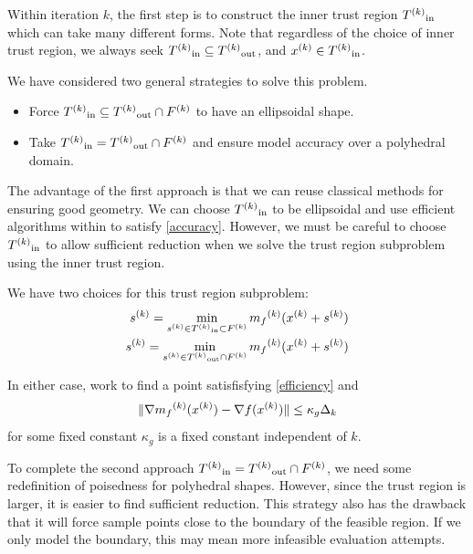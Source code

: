 Within iteration $k$, the first step is to construct the inner trust region ${T^{(k)}}_{\text{in}}$ which can take many different forms.
Note that regardless of the choice of inner trust region, we always seek
${T^{(k)}}_{\text{in}} \subseteq {T^{(k)}}_{\text{out}} $, and ${x}^{(k)} \in {T^{(k)}}_{\text{in}}$.


We have considered two general strategies to solve this problem.

\begin{itemize}
\item Force $\label{bluepill} {T^{(k)}}_{\text{in}} \subseteq {T^{(k)}}_{\text{out}} \cap {F}^{(k)}$ to have an ellipsoidal shape.
\item Take $\label{redpill} {T^{(k)}}_{\text{in}} = {T^{(k)}}_{\text{out}} \cap {F}^{(k)}$ and ensure model accuracy over a polyhedral domain.
\end{itemize}

The advantage of the first approach is that we can reuse classical methods for ensuring good geometry.
We can choose ${T^{(k)}}_{\text{in}}$ to be ellipsoidal and use efficient algorithms within \cite{DUMMY:intro_book} to satisfy \ref{accuracy}.
However, we must be careful to choose ${T^{(k)}}_{\text{in}}$ to allow sufficient reduction when we solve the trust region subproblem using the inner trust region.


We have two choices for this trust region subproblem:
\begin{align}
{s}^{(k)} = \min_{{s}^{(k)} \in {T^{(k)}}_{\text{in}} \subset {F}^{(k)}} {{m}_f}^{(k)}({x}^{(k)} + {s}^{(k)}) \label{search_a_little} \\
{s}^{(k)} = \min_{{s}^{(k)} \in {T^{(k)}}_{\text{out}} \cap {F}^{(k)}} {{m}_f}^{(k)}({x}^{(k)} + {s}^{(k)}) \label{search_a_lot}
\end{align}

In either case, work to find a point satisfisfying \ref{efficiency} and 
\begin{equation}
\label{accuracy}
\|\nabla {{m}_f}^{(k)}({x}^{(k)}) - \nabla f({x}^{(k)}) \| \le \kappa_g \Delta_k
\end{equation}
 for some fixed constant $\kappa_g$ is a fixed constant independent of $k$.

 

To complete the second approach ${T^{(k)}}_{\text{in}} = {T^{(k)}}_{\text{out}} \cap {F}^{(k)}$, we need some redefinition of poisedness for polyhedral shapes.
However, since the trust region is larger, it is easier to find sufficient reduction.
This strategy also has the drawback that it will force sample points close to the boundary of the feasible region.
If we only model the boundary, this may mean more infeasible evaluation attempts.

